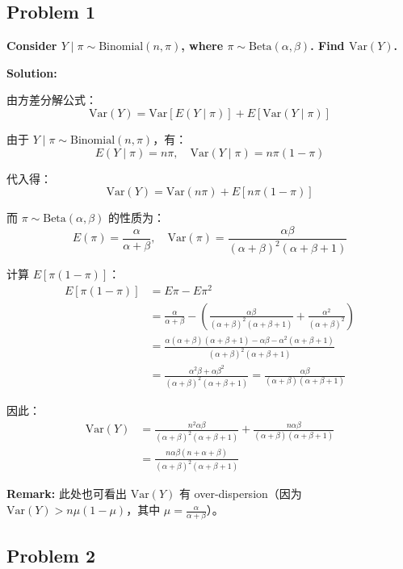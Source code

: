 \subsection{Problem 1}

\textbf{Consider $Y \mid \pi \sim \text{Binomial}(n, \pi)$, where $\pi \sim \text{Beta}(\alpha, \beta)$. Find $\text{Var}(Y)$.}

\textbf{Solution:}

由方差分解公式：
\[
\text{Var}(Y) = \text{Var}[E(Y \mid \pi)] + E[\text{Var}(Y \mid \pi)]
\]

由于 $Y \mid \pi \sim \text{Binomial}(n, \pi)$，有：
\[
E(Y \mid \pi) = n\pi, \quad \text{Var}(Y \mid \pi) = n\pi(1-\pi)
\]

代入得：
\[
\text{Var}(Y) = \text{Var}(n\pi) + E[n\pi(1-\pi)]
\]

而 $\pi \sim \text{Beta}(\alpha, \beta)$ 的性质为：
\[
E(\pi) = \frac{\alpha}{\alpha+\beta}, \quad \text{Var}(\pi) = \frac{\alpha\beta}{(\alpha+\beta)^2(\alpha+\beta+1)}
\]

计算 $E[\pi(1-\pi)]$：
\begin{align*}
E[\pi(1-\pi)] &= E\pi - E\pi^2 \\
&= \frac{\alpha}{\alpha+\beta} - \left(\frac{\alpha\beta}{(\alpha+\beta)^2(\alpha+\beta+1)} + \frac{\alpha^2}{(\alpha+\beta)^2}\right) \\
&= \frac{\alpha(\alpha+\beta)(\alpha+\beta+1) - \alpha\beta - \alpha^2(\alpha+\beta+1)}{(\alpha+\beta)^2(\alpha+\beta+1)} \\
&= \frac{\alpha^2\beta + \alpha\beta^2}{(\alpha+\beta)^2(\alpha+\beta+1)} = \frac{\alpha\beta}{(\alpha+\beta)(\alpha+\beta+1)}
\end{align*}

因此：
\begin{align*}
\text{Var}(Y) &= \frac{n^2\alpha\beta}{(\alpha+\beta)^2(\alpha+\beta+1)} + \frac{n\alpha\beta}{(\alpha+\beta)(\alpha+\beta+1)} \\
&= \boxed{\frac{n\alpha\beta(n+\alpha+\beta)}{(\alpha+\beta)^2(\alpha+\beta+1)}}
\end{align*}

\textbf{Remark:} 此处也可看出 $\text{Var}(Y)$ 有 over-dispersion（因为 $\text{Var}(Y) > n\mu(1-\mu)$，其中 $\mu = \frac{\alpha}{\alpha+\beta}$）。

\subsection{Problem 2}


